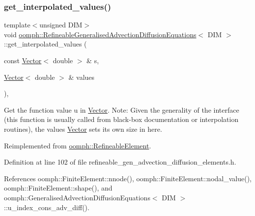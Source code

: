 \subsubsection{\texorpdfstring{get\+\_\+interpolated\+\_\+values()}{get\_interpolated\_values()}\hspace{0.1cm}{\footnotesize\ttfamily [1/2]}}
{\footnotesize\ttfamily template$<$unsigned D\+IM$>$ \\
void \hyperlink{classoomph_1_1RefineableGeneralisedAdvectionDiffusionEquations}{oomph\+::\+Refineable\+Generalised\+Advection\+Diffusion\+Equations}$<$ D\+IM $>$\+::get\+\_\+interpolated\+\_\+values (\begin{DoxyParamCaption}\item[{const \hyperlink{classoomph_1_1Vector}{Vector}$<$ double $>$ \&}]{s,  }\item[{\hyperlink{classoomph_1_1Vector}{Vector}$<$ double $>$ \&}]{values }\end{DoxyParamCaption})\hspace{0.3cm}{\ttfamily [inline]}, {\ttfamily [virtual]}}



Get the function value u in \hyperlink{classoomph_1_1Vector}{Vector}. Note\+: Given the generality of the interface (this function is usually called from black-\/box documentation or interpolation routines), the values \hyperlink{classoomph_1_1Vector}{Vector} sets its own size in here. 



Reimplemented from \hyperlink{classoomph_1_1RefineableElement_ad9a4f92880668a2373326d8306365c43}{oomph\+::\+Refineable\+Element}.



Definition at line 102 of file refineable\+\_\+gen\+\_\+advection\+\_\+diffusion\+\_\+elements.\+h.



References oomph\+::\+Finite\+Element\+::nnode(), oomph\+::\+Finite\+Element\+::nodal\+\_\+value(), oomph\+::\+Finite\+Element\+::shape(), and oomph\+::\+Generalised\+Advection\+Diffusion\+Equations$<$ D\+I\+M $>$\+::u\+\_\+index\+\_\+cons\+\_\+adv\+\_\+diff().

\mbox{\label{classoomph_1_1RefineableGeneralisedAdvectionDiffusionEquations_abee0a8a1988d23678cab1566474c5be2}} 
